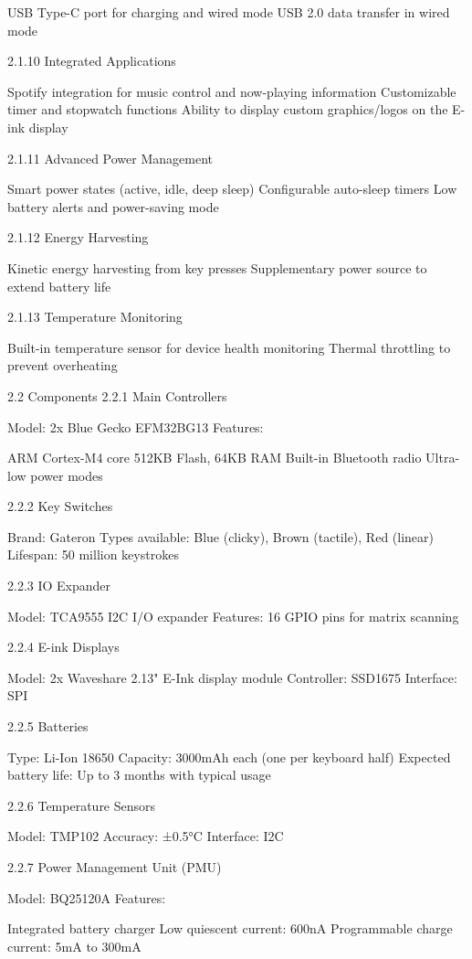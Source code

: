 \documentclass[a4paper,11pt]{article}%
\begin{document}
USB Type-C port for charging and wired mode
USB 2.0 data transfer in wired mode

2.1.10 Integrated Applications

Spotify integration for music control and now-playing information
Customizable timer and stopwatch functions
Ability to display custom graphics/logos on the E-ink display

2.1.11 Advanced Power Management

Smart power states (active, idle, deep sleep)
Configurable auto-sleep timers
Low battery alerts and power-saving mode

2.1.12 Energy Harvesting

Kinetic energy harvesting from key presses
Supplementary power source to extend battery life

2.1.13 Temperature Monitoring

Built-in temperature sensor for device health monitoring
Thermal throttling to prevent overheating

2.2 Components
2.2.1 Main Controllers

Model: 2x Blue Gecko EFM32BG13
Features:

ARM Cortex-M4 core
512KB Flash, 64KB RAM
Built-in Bluetooth radio
Ultra-low power modes



2.2.2 Key Switches

Brand: Gateron
Types available: Blue (clicky), Brown (tactile), Red (linear)
Lifespan: 50 million keystrokes

2.2.3 IO Expander

Model: TCA9555 I2C I/O expander
Features: 16 GPIO pins for matrix scanning

2.2.4 E-ink Displays

Model: 2x Waveshare 2.13" E-Ink display module
Controller: SSD1675
Interface: SPI

2.2.5 Batteries

Type: Li-Ion 18650
Capacity: 3000mAh each (one per keyboard half)
Expected battery life: Up to 3 months with typical usage

2.2.6 Temperature Sensors

Model: TMP102
Accuracy: ±0.5°C
Interface: I2C

2.2.7 Power Management Unit (PMU)

Model: BQ25120A
Features:

Integrated battery charger
Low quiescent current: 600nA
Programmable charge current: 5mA to 300mA
\end{document}
